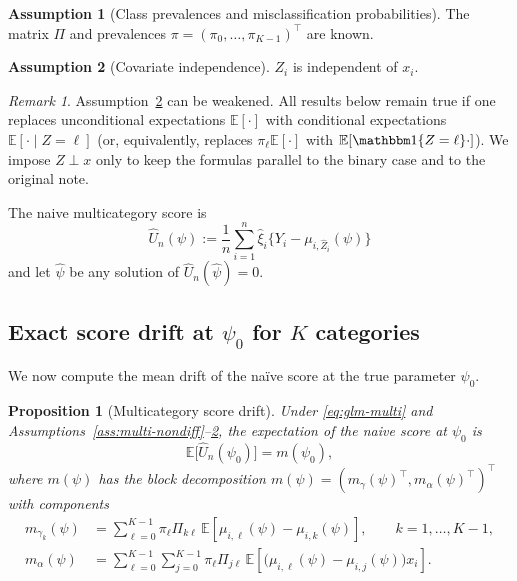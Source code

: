\documentclass[11pt]{article}
\newtheorem{proposition}{Proposition}
\theoremstyle{definition}
\newtheorem{assumption}{Assumption}
\theoremstyle{remark}
\newtheorem{remark}{Remark}
\newcommand{\E}{\mathbb{E}}
\begin{document}
\begin{assumption}[Class prevalences and misclassification probabilities]\label{ass:multi-known}
The matrix $\Pi$ and prevalences $\pi=(\pi_0,\dots,\pi_{K-1})^\top$ are known.
\end{assumption}

\begin{assumption}[Covariate independence]\label{ass:multi-indep}
$Z_i$ is independent of $x_i$.
\end{assumption}

\begin{remark}
Assumption~\ref{ass:multi-indep} can be weakened.
All results below remain true if one replaces unconditional expectations $\E[\cdot]$ with conditional
expectations $\E[\cdot\mid Z=\ell]$ (or, equivalently, replaces $\pi_\ell\E[\cdot]$ with $\E[\mathbbm 1\{Z=\ell\}\cdot]$).
We impose $Z\perp x$ only to keep the formulas parallel to the binary case and to the original note.
\end{remark}


The naive multicategory score is
\begin{equation}
\hat U_n(\psi):=\frac{1}{n}\sum_{i=1}^n \hat\xi_i\Big\{Y_i-\mu_{i,\hat Z_i}(\psi)\Big\}
\label{eq:Uhat-multi}
\end{equation}
and let $\hat\psi$ be any solution of $\hat U_n(\hat\psi)=0$.

\subsection{Exact score drift at $\psi_0$ for $K$ categories}

We now compute the mean drift of the na\"ive score at the true parameter $\psi_0$.

\begin{proposition}[Multicategory score drift]\label{prop:multi-drift}
Under \eqref{eq:glm-multi} and Assumptions~\ref{ass:multi-nondiff}--\ref{ass:multi-indep},
the expectation of the naive score at $\psi_0$ is
\[
\E\big[\hat U_n(\psi_0)\big]=m(\psi_0),
\]
where $m(\psi)$ has the block decomposition $m(\psi)=(m_\gamma(\psi)^\top,m_\alpha(\psi)^\top)^\top$ with
components
\begin{align}
m_{\gamma_k}(\psi)
&=\sum_{\ell=0}^{K-1}\pi_\ell \Pi_{k\ell}\,\E\!\left[\mu_{i,\ell}(\psi)-\mu_{i,k}(\psi)\right],
\qquad k=1,\dots,K-1, \label{eq:multi-drift-gamma}\\[4pt]
m_{\alpha}(\psi)
&=\sum_{\ell=0}^{K-1}\sum_{j=0}^{K-1}\pi_\ell \Pi_{j\ell}\,
\E\!\left[\big(\mu_{i,\ell}(\psi)-\mu_{i,j}(\psi)\big)x_i\right].
\label{eq:multi-drift-alpha}
\end{align}
\end{proposition}
\end{document}
